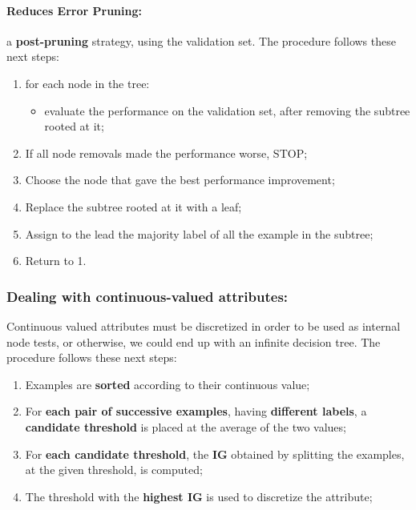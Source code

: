 \paragraph{Reduces Error Pruning:} a \textbf{post-pruning} strategy, using the validation set. The procedure follows these next steps:
\begin{enumerate}
    \item for each node in the tree:
    \begin{itemize}
        \item evaluate the performance on the validation set, after removing the subtree rooted at it;
    \end{itemize}
    \item If all node removals made the performance worse, STOP;
    \item Choose the node that gave the best performance improvement;
    \item Replace the subtree rooted at it with a leaf;
    \item Assign to the lead the majority label of all the example in the subtree;
    \item Return to 1.
\end{enumerate}

\subsubsection{Dealing with continuous-valued attributes:}
Continuous valued attributes must be discretized in order to be used as internal node tests, or otherwise, we could end up with an infinite decision tree. The procedure follows these next steps:
\begin{enumerate}
    \item Examples are \textbf{sorted} according to their continuous value;
    \item For \textbf{each pair of successive examples}, having \textbf{different labels}, a \textbf{candidate threshold} is placed at the average of the two values;
    \item For \textbf{each candidate threshold}, the \textbf{IG} obtained by splitting the examples, at the given threshold, is computed;
    \item The threshold with the \textbf{highest IG} is used to discretize the attribute;
\end{enumerate}

